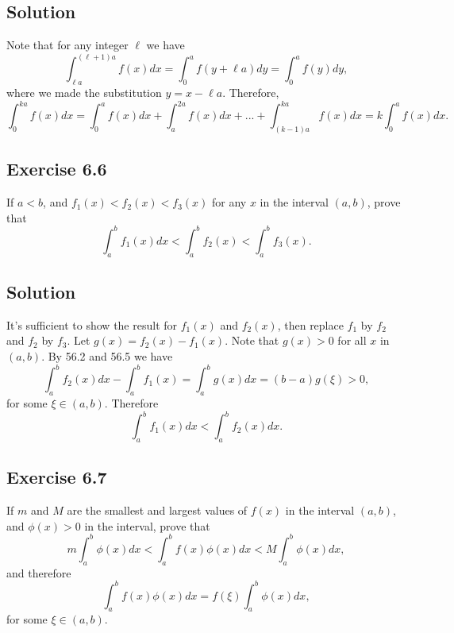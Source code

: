 \subsection*{Solution}

Note that for any integer $\ell$ we have
\begin{equation*}
    \int_{\ell a}^{(\ell + 1)a} f(x) dx = \int_0^a f(y + \ell a) dy = \int_0^a f(y) dy,
\end{equation*}
where we made the substitution $y = x - \ell a$.
Therefore,
\begin{equation*}
    \int_0^{ka} f(x) dx
        = \int_0^a f(x) dx + \int_a^{2a} f(x) dx + ... + \int_{(k-1)a}^{ka} f(x) dx
        = k \int_0^a f(x) dx.
\end{equation*}


\subsection*{Exercise 6.6}

If $a < b$, and $f_1(x) < f_2(x) < f_3(x)$ for any $x$ in the interval $(a, b)$, prove that
\begin{equation*}
    \int_a^b f_1(x)dx < \int_a^b f_2(x) < \int_a^b f_3(x).
\end{equation*}

\subsection*{Solution}

It's sufficient to show the result for $f_1(x)$ and $f_2(x)$, then replace $f_1$ by $f_2$ and $f_2$ by $f_3$.
Let $g(x) = f_2(x) - f_1(x)$.
Note that $g(x) > 0$ for all $x$ in $(a, b)$.
By 56.2 and 56.5 we have
\begin{equation*}
    \int_a^b f_2(x) dx - \int_a^b f_1(x) = \int_a^b g(x) dx = (b - a) g(\xi) > 0,
\end{equation*}
for some $\xi \in (a, b)$.
Therefore
\begin{equation*}
    \int_a^b f_1(x) dx < \int_a^b f_2(x) dx.
\end{equation*}


\subsection*{Exercise 6.7}

If $m$ and $M$ are the smallest and largest values of $f(x)$ in the interval $(a, b)$, and $\phi(x) > 0$ in the interval, prove that
\begin{equation*}
    m \int_a^b \phi(x) dx < \int_a^b f(x) \phi(x) dx < M \int_a^b \phi(x) dx,
\end{equation*}
and therefore
\begin{equation*}
    \int_a^b f(x) \phi(x) dx = f(\xi) \int_a^b \phi(x) dx,
\end{equation*}
for some $\xi \in (a, b)$.

